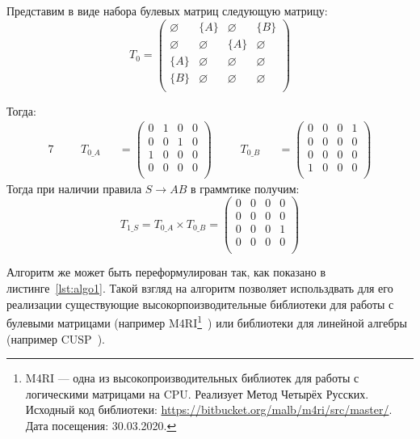 \begin{example}
Представим в виде набора булевых матриц следующую матрицу:
\[
T_0 = \begin{pmatrix}
\varnothing & \{A\}       & \varnothing & \{B\}       \\
\varnothing & \varnothing & \{A\}       & \varnothing \\
\{A\}       & \varnothing & \varnothing & \varnothing \\
\{B\}       & \varnothing & \varnothing & \varnothing \\
\end{pmatrix}
\]

Тогда:
\begin{alignat*}{7}
& &&T_{0\_A} &&= \begin{pmatrix}
0 & 1       & 0 & 0       \\
0 & 0 & 1       & 0 \\
1  & 0 & 0 & 0       \\
0       & 0 & 0 & 0 \\
\end{pmatrix} \ \ \ \ &&T_{0\_B} &&= \begin{pmatrix}
0 & 0       & 0 & 1       \\
0       & 0 & 0       & 0 \\
0  & 0 & 0 & 0       \\
1       & 0 & 0 & 0 \\
\end{pmatrix}
\end{alignat*}
Тогда при наличии правила $S \to A B$ в граммтике получим:
\[
T_{1\_S} =T_{0\_A} \times T_{0\_B} = \begin{pmatrix}
0 & 0       & 0 & 0       \\
0       & 0 & 0       & 0 \\
0  & 0 & 0 & 1       \\
0       & 0 & 0 & 0 \\
\end{pmatrix}
\]
\end{example}

Алгоритм же может быть переформулирован так, как показано в листинге~\ref{lst:algo1}. Такой взгляд на алгоритм позволяет использдвать для его реализации существующие высокорпоизводительные библиотеки для работы с булевыми матрицами (например M4RI\footnote{M4RI --- одна из высокопроизводительных библиотек для работы с логическими матрицами на CPU. Реализует Метод Четырёх Русских. Исходный код библиотеки: \url{https://bitbucket.org/malb/m4ri/src/master/}. Дата посещения: 30.03.2020.}~\cite{DBLP:journals/corr/abs-0811-1714}) или библиотеки для линейной алгебры (например CUSP~\cite{Cusp}).

